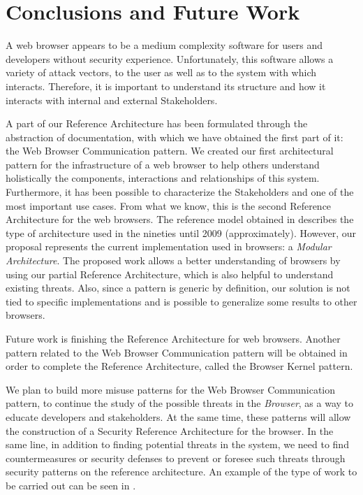 \documentclass[prodmode,acmtecs]{acmsmall}
\begin{document}
\section{Conclusions and Future Work}
A web browser appears to be a medium complexity software for users and developers without security experience. Unfortunately, this software allows a variety of attack vectors, to the user as well as to the system with which interacts. Therefore, it is important to understand its structure and how it interacts with internal and external Stakeholders.

A part of our Reference Architecture has been formulated through the abstraction of documentation, with which we have obtained the first part of it: the Web Browser Communication pattern. We created our first architectural pattern for the infrastructure of a web browser to help others understand holistically the components, interactions and relationships of this system. Furthermore, it has been possible to characterize the Stakeholders and one of the most important use cases. From what we know, this is the second Reference Architecture for the web browsers. The reference model obtained in \cite{2005-grosskurth-browser-refarch} describes the type of architecture used in the nineties until 2009 (approximately). However, our proposal represents the current implementation used in browsers: a \textit{Modular Architecture}. The proposed work allows a better understanding of browsers by using our partial Reference Architecture, which is also helpful to understand existing threats. Also, since a pattern is generic by definition, our solution is not tied to specific implementations and is possible to generalize some results to other browsers. 

Future work is finishing the Reference Architecture for web browsers. Another pattern related to the Web Browser Communication pattern will be obtained in order to complete the Reference Architecture, called the Browser Kernel pattern. 

We plan to build more \cite{silva2015b} misuse patterns for the Web Browser Communication pattern, to continue the study of the possible threats in the \textit{Browser}, as a way to educate developers and stakeholders. At the same time, these patterns will allow the construction of a Security Reference Architecture for the browser. In the same line, in addition to finding potential threats in the system, we need to find countermeasures or security defenses to prevent or foresee such threats through security patterns on the reference architecture. An example of the type of work to be carried out can be seen in \cite{Fernandez2015}.
\end{document}

